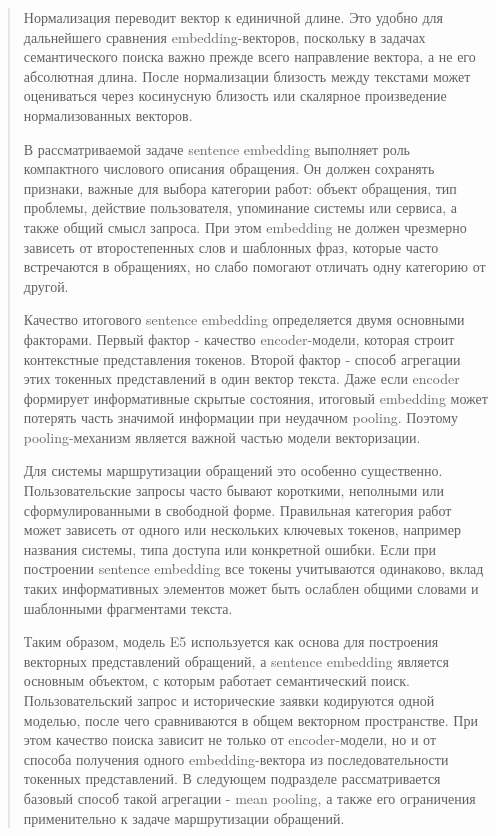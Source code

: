 \documentclass[
]{article}
\begin{document}
\begin{quote}
Нормализация переводит вектор к единичной длине. Это удобно для
дальнейшего сравнения embedding-векторов, поскольку в задачах
семантического поиска важно прежде всего направление вектора, а не его
абсолютная длина. После нормализации близость между текстами может
оцениваться через косинусную близость или скалярное произведение
нормализованных векторов.

В рассматриваемой задаче sentence embedding выполняет роль компактного
числового описания обращения. Он должен сохранять признаки, важные для
выбора категории работ: объект обращения, тип проблемы, действие
пользователя, упоминание системы или сервиса, а также общий смысл
запроса. При этом embedding не должен чрезмерно зависеть от
второстепенных слов и шаблонных фраз, которые часто встречаются в
обращениях, но слабо помогают отличать одну категорию от другой.

Качество итогового sentence embedding определяется двумя основными
факторами. Первый фактор - качество encoder-модели, которая строит
контекстные представления токенов. Второй фактор - способ агрегации этих
токенных представлений в один вектор текста. Даже если encoder формирует
информативные скрытые состояния, итоговый embedding может потерять часть
значимой информации при неудачном pooling. Поэтому pooling-механизм
является важной частью модели векторизации.

Для системы маршрутизации обращений это особенно существенно.
Пользовательские запросы часто бывают короткими, неполными или
сформулированными в свободной форме. Правильная категория работ может
зависеть от одного или нескольких ключевых токенов, например названия
системы, типа доступа или конкретной ошибки. Если при построении
sentence embedding все токены учитываются одинаково, вклад таких
информативных элементов может быть ослаблен общими словами и шаблонными
фрагментами текста.

Таким образом, модель E5 используется как основа для построения
векторных представлений обращений, а sentence embedding является
основным объектом, с которым работает семантический поиск.
Пользовательский запрос и исторические заявки кодируются одной моделью,
после чего сравниваются в общем векторном пространстве. При этом
качество поиска зависит не только от encoder-модели, но и от способа
получения одного embedding-вектора из последовательности токенных
представлений. В следующем подразделе рассматривается базовый способ
такой агрегации - mean pooling, а также его ограничения применительно к
задаче маршрутизации обращений.
\end{quote}
\end{document}
